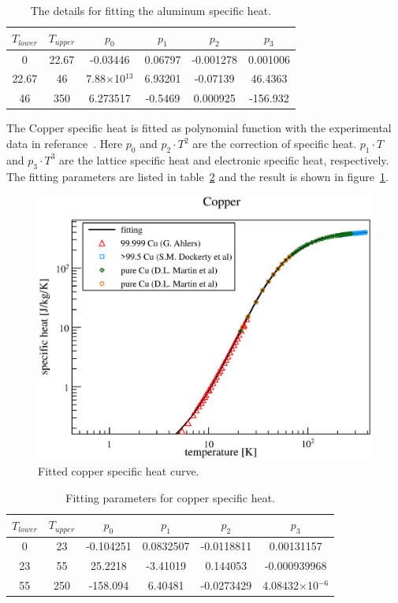\begin{table}[H]
 \centering
 \begin{tabular}{cccccc} \hline \hline
 $T_{lower}$ & $T_{upper}$ & $p_0$ & $p_1$ & $p_2$ & $p_3$ \\ \hline
 0 & 22.67 & -0.03446 & 0.06797 & -0.001278 & 0.001006 \\
 22.67 & 46 & 7.88$\times$10$^{13}$ & 6.93201 & -0.07139 & 46.4363 \\
 46 & 350 & 6.273517 & -0.5469 & 0.000925 & -156.932 \\ \hline \hline
 \end{tabular}
 \caption{The details for fitting the aluminum specific heat.}
 \label{4alsh}
\end{table}

The Copper specific heat is fitted as polynomial function with the experimental data in referance~\cite{aldata}.
Here $p_0$ and $p_2 \cdot T^2$ are the correction of specific heat.
$p_1 \cdot T$ and $p_3 \cdot T^3$ are the lattice specific heat and electronic specific heat, respectively.
The fitting parameters are listed in table~\ref{cufit} and the result is shown in figure~\ref{4cush}.
\begin{figure}[H]
   \centering
   \includegraphics[scale=0.47]{chapter5/fig/cush.eps}
   \caption{ Fitted copper specific heat curve.}
   \label{4cush}
  \end{figure}
\begin{table}[H]
 \centering
 \begin{tabular}{cccccc} \hline \hline
  $T_{lower}$ & $T_{upper}$ & $p_0$ & $p_1$ & $p_2$ & $p_3$ \\ \hline
  0 & 23 & -0.104251 & 0.0832507 & -0.0118811 & 0.00131157 \\
  23 & 55 & 25.2218 & -3.41019 & 0.144053 & -0.000939968 \\
  55 & 250 & -158.094 & 6.40481 & -0.0273429 & 4.08432$\times$10$^{-6}$ \\ \hline \hline
 \end{tabular}
 \caption{Fitting parameters for copper specific heat.}
 \label{cufit}
\end{table}
